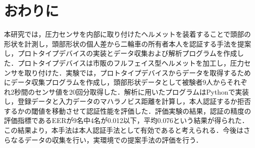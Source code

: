 \chapter{おわりに}
\label{conclude}
本研究では，圧力センサを内部に取り付けたヘルメットを装着することで頭部の形状を計測し，頭部形状の個人差から二輪車の所有者本人を認証する手法を提案し，プロトタイプデバイスの実装とデータ収集および解析プログラムを作成した．プロトタイプデバイスは市販のフルフェイス型ヘルメットを加工し，圧力センサを取り付けた．実験では，プロトタイプデバイスからデータを取得するためにデータ収集プログラムを作成し，頭部形状データとして被験者9人からそれぞれ2秒間のセンサ値を20回分取得した．解析に用いたプログラムはPythonで実装し，登録データと入力データのマハラノビス距離を計算し，本人認証するか拒否するかの閾値を移動させて認証性能を評価した．評価実験の結果，認証の精度の評価指標であるEERが9名中4名が0.012以下，平均0.076という結果が得られた．この結果より，本手法は本人認証手法として有効であると考えられる．今後はさらなるデータの収集を行い，実環境での提案手法の評価を行う．